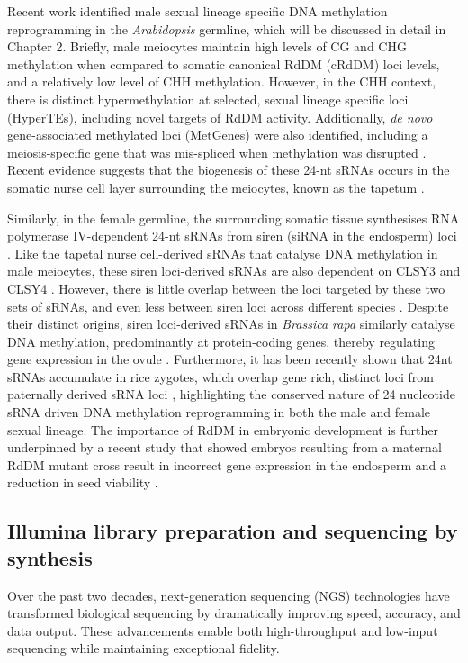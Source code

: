 Recent work identified male sexual lineage specific DNA methylation reprogramming in the \textit{Arabidopsis} germline, which will be discussed in detail in Chapter 2. Briefly, male meiocytes maintain high levels of CG and CHG methylation when compared to somatic canonical RdDM (cRdDM) loci levels, and a relatively low level of CHH methylation. However, in the CHH context, there is distinct hypermethylation at selected, sexual lineage specific loci (HyperTEs), including novel targets of RdDM activity. Additionally, \textit{de novo} gene-associated methylated loci (MetGenes) were also identified, including a meiosis-specific gene that was mis-spliced when methylation was disrupted \cite{RN199}. Recent evidence suggests that the biogenesis of these 24-nt sRNAs occurs in the somatic nurse cell layer surrounding the meiocytes, known as the tapetum \cite{RN187}. 

Similarly, in the female germline, the surrounding somatic tissue synthesises RNA polymerase IV-dependent 24-nt sRNAs from siren (siRNA in the endosperm) loci \cite{RN164,RN163,RN162}. Like the tapetal nurse cell-derived sRNAs that catalyse DNA methylation in male meiocytes, these siren loci-derived sRNAs are also dependent on CLSY3 and CLSY4 \cite{RN162}. However, there is little overlap between the loci targeted by these two sets of sRNAs, and even less between siren loci across different species \cite{RN163}. Despite their distinct origins, siren loci-derived sRNAs in \textit{Brassica rapa} similarly catalyse DNA methylation, predominantly at protein-coding genes, thereby regulating gene expression in the ovule \cite{RN165}. Furthermore, it has been recently shown that 24nt sRNAs accumulate in rice zygotes, which overlap gene rich, distinct loci from paternally derived sRNA loci \cite{RN166}, highlighting the conserved nature of 24 nucleotide sRNA driven DNA methylation reprogramming in both the male and female sexual lineage. The importance of RdDM in embryonic development is further underpinned by a recent study that showed embryos resulting from a maternal RdDM mutant cross result in incorrect gene expression in the endosperm and a reduction in seed viability \cite{RN167}.

\subsection{Illumina library preparation and sequencing by synthesis}

Over the past two decades, next-generation sequencing (NGS) technologies have transformed biological sequencing by dramatically improving speed, accuracy, and data output. These advancements enable both high-throughput and low-input sequencing while maintaining exceptional fidelity.

